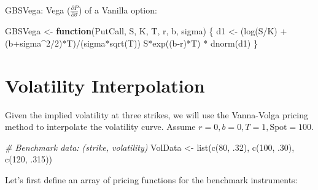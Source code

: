 \documentclass[
]{article}
\newenvironment{Shaded}{\begin{snugshade}}{\end{snugshade}}
\newcommand{\CommentTok}[1]{\textcolor[rgb]{0.56,0.35,0.01}{\textit{#1}}}
\newcommand{\ControlFlowTok}[1]{\textcolor[rgb]{0.13,0.29,0.53}{\textbf{#1}}}
\newcommand{\DecValTok}[1]{\textcolor[rgb]{0.00,0.00,0.81}{#1}}
\newcommand{\FunctionTok}[1]{\textcolor[rgb]{0.00,0.00,0.00}{#1}}
\newcommand{\NormalTok}[1]{#1}
\newcommand{\OtherTok}[1]{\textcolor[rgb]{0.56,0.35,0.01}{#1}}
\newcommand{\SpecialCharTok}[1]{\textcolor[rgb]{0.00,0.00,0.00}{#1}}
\begin{document}
GBSVega: Vega (\(\frac{\partial P}{\partial \sigma}\)) of a Vanilla
option:

\begin{Shaded}
\begin{Highlighting}[]
\NormalTok{GBSVega }\OtherTok{\textless{}{-}} \ControlFlowTok{function}\NormalTok{(PutCall, S, K, T, r, b, sigma) \{}
\NormalTok{  d1 }\OtherTok{\textless{}{-}}\NormalTok{ (}\FunctionTok{log}\NormalTok{(S}\SpecialCharTok{/}\NormalTok{K) }\SpecialCharTok{+}\NormalTok{ (b}\SpecialCharTok{+}\NormalTok{sigma}\SpecialCharTok{\^{}}\DecValTok{2}\SpecialCharTok{/}\DecValTok{2}\NormalTok{)}\SpecialCharTok{*}\NormalTok{T)}\SpecialCharTok{/}\NormalTok{(sigma}\SpecialCharTok{*}\FunctionTok{sqrt}\NormalTok{(T))}
\NormalTok{  S}\SpecialCharTok{*}\FunctionTok{exp}\NormalTok{((b}\SpecialCharTok{{-}}\NormalTok{r)}\SpecialCharTok{*}\NormalTok{T) }\SpecialCharTok{*} \FunctionTok{dnorm}\NormalTok{(d1)}
\NormalTok{\}}
\end{Highlighting}
\end{Shaded}

\hypertarget{volatility-interpolation}{%
\section{Volatility Interpolation}\label{volatility-interpolation}}

Given the implied volatility at three strikes, we will use the
Vanna-Volga pricing method to interpolate the volatility curve. Assume
\(r=0, b=0, T=1, \mbox{Spot} = 100\).

\begin{Shaded}
\begin{Highlighting}[]
\CommentTok{\# Benchmark data: (strike, volatility)}
\NormalTok{VolData }\OtherTok{\textless{}{-}} \FunctionTok{list}\NormalTok{(}\FunctionTok{c}\NormalTok{(}\DecValTok{80}\NormalTok{, .}\DecValTok{32}\NormalTok{), }\FunctionTok{c}\NormalTok{(}\DecValTok{100}\NormalTok{, .}\DecValTok{30}\NormalTok{), }\FunctionTok{c}\NormalTok{(}\DecValTok{120}\NormalTok{, .}\DecValTok{315}\NormalTok{))}
\end{Highlighting}
\end{Shaded}

Let's first define an array of pricing functions for the benchmark
instruments:
\end{document}

